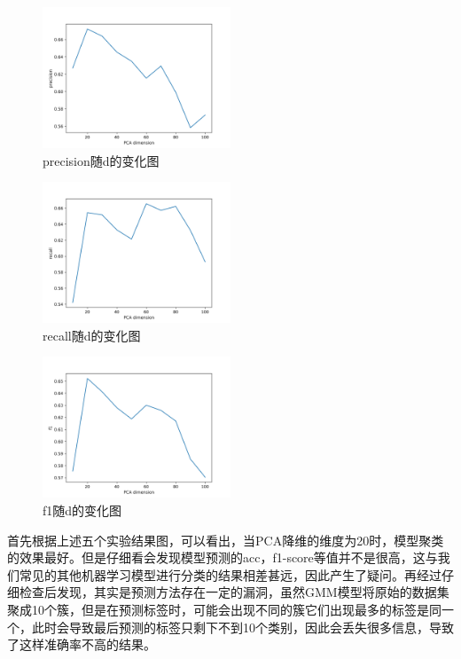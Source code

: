 \documentclass[UTF8]{ctexart}
\begin{document}
\begin{figure}[!h]
  \includegraphics[width=0.5\textwidth]{./figures/cluster_precision.png}
  \centering
  \caption{precision随d的变化图}
  \label{cluster_precision}
\end{figure}


\begin{figure}[!h]
  \includegraphics[width=0.5\textwidth]{./figures/cluster_recall.png}
  \centering
  \caption{recall随d的变化图}
  \label{cluster_recall}
\end{figure}


\begin{figure}[!h]
  \includegraphics[width=0.5\textwidth]{./figures/cluster_f1.png}
  \centering
  \caption{f1随d的变化图}
  \label{cluster_f1}
\end{figure}

首先根据上述五个实验结果图，可以看出，当PCA降维的维度为20时，模型聚类的效果最好。但是仔细看会发现模型预测的acc，f1-score等值并不是很高，这与我们常见的其他机器学习模型进行分类的结果相差甚远，因此产生了疑问。再经过仔细检查后发现，其实是预测方法存在一定的漏洞，虽然GMM模型将原始的数据集聚成10个簇，但是在预测标签时，可能会出现不同的簇它们出现最多的标签是同一个，此时会导致最后预测的标签只剩下不到10个类别，因此会丢失很多信息，导致了这样准确率不高的结果。
\end{document}
